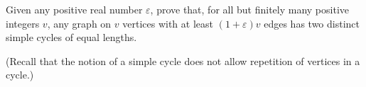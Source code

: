 Given any positive real number $\varepsilon$, prove that, for all but finitely many positive integers $v$, any graph on $v$ vertices with at least  $(1+\varepsilon)v$ edges has two distinct simple cycles of equal lengths.

(Recall that the notion of a simple cycle does not allow repetition of vertices in a cycle.)